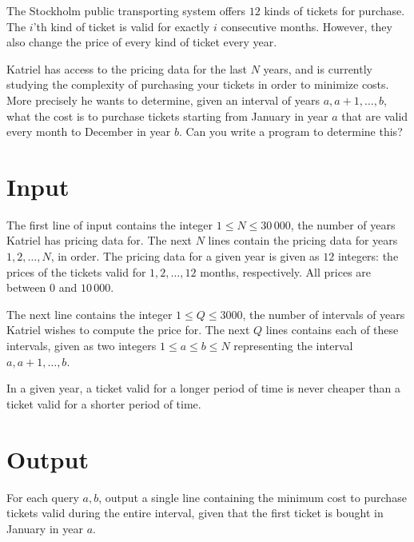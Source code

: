 The Stockholm public transporting system offers $12$ kinds of tickets for purchase.
The $i$'th kind of ticket is valid for exactly $i$ consecutive months.
However, they also change the price of every kind of ticket every year.

Katriel has access to the pricing data for the last $N$ years, and is currently studying the complexity of purchasing your tickets in order to minimize costs.
More precisely he wants to determine, given an interval of years $a, a + 1, \dots, b$, what the cost is to purchase tickets starting from January in year $a$ that are valid every month to December in year $b$.
Can you write a program to determine this?

\section*{Input}
The first line of input contains the integer $1 \le N \le 30\,000$, the number of years Katriel has pricing data for.
The next $N$ lines contain the pricing data for years $1, 2, \dots, N$, in order.
The pricing data for a given year is given as $12$ integers: the prices of the tickets valid for $1, 2, \dots, 12$ months, respectively.
All prices are between $0$ and $10\,000$.

The next line contains the integer $1 \le Q \le 3000$, the number of intervals of years Katriel wishes to compute the price for.
The next $Q$ lines contains each of these intervals, given as two integers $1 \le a \le b \le N$ representing the interval $a, a + 1, \dots, b$.

In a given year, a ticket valid for a longer period of time is never cheaper than a ticket valid for a shorter period of time.

\section*{Output}
For each query $a, b$, output a single line containing the minimum cost to purchase tickets valid during the entire interval, given that the first ticket is bought in January in year $a$.
